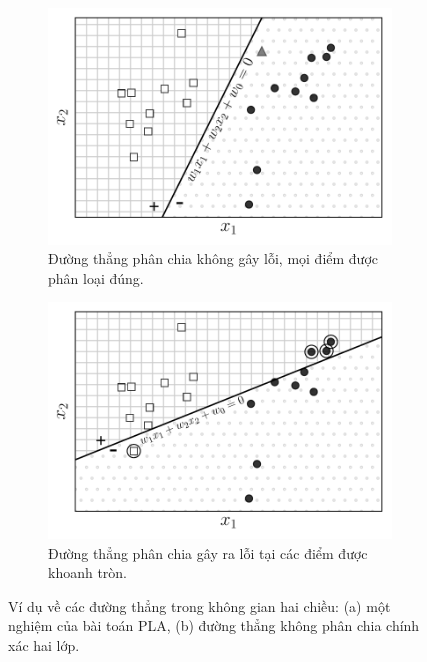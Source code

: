  

 
\begin{figure}[t]
    \begin{subfigure}{0.49\textwidth}
    \includegraphics[width=0.99\linewidth]{ebookML_src/src/perceptron/pla4.pdf}
    \caption{Đường thẳng phân chia không gây lỗi, mọi điểm được phân loại đúng.}
    \label{fig:9_2a}
    \end{subfigure}
    \begin{subfigure}{0.49\textwidth}
    \includegraphics[width=0.99\linewidth]{ebookML_src/src/perceptron/pla3.pdf}
    \caption{Đường thẳng phân chia gây ra lỗi tại các điểm được khoanh tròn.}
    \label{fig:9_2b}
    \end{subfigure}
    \caption{
     Ví dụ về các đường thẳng trong không gian hai chiều: (a) một nghiệm của bài toán PLA, (b) đường thẳng không phân chia chính xác hai lớp. 
    }
    \label{fig:9_2}
\end{figure}

